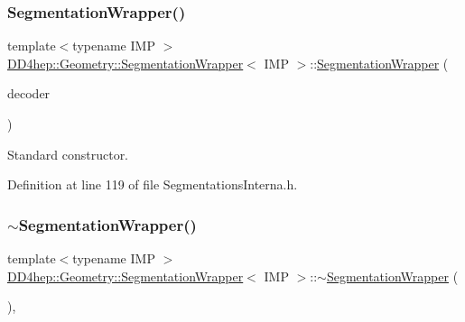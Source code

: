 \subsubsection{\texorpdfstring{Segmentation\+Wrapper()}{SegmentationWrapper()}}
{\footnotesize\ttfamily template$<$typename I\+MP $>$ \\
\hyperlink{class_d_d4hep_1_1_geometry_1_1_segmentation_wrapper}{D\+D4hep\+::\+Geometry\+::\+Segmentation\+Wrapper}$<$ I\+MP $>$\+::\hyperlink{class_d_d4hep_1_1_geometry_1_1_segmentation_wrapper}{Segmentation\+Wrapper} (\begin{DoxyParamCaption}\item[{\hyperlink{class_d_d4hep_1_1_d_d_segmentation_1_1_bit_field64}{D\+D\+Segmentation\+::\+Bit\+Field64} $\ast$}]{decoder }\end{DoxyParamCaption})\hspace{0.3cm}{\ttfamily [inline]}}



Standard constructor. 



Definition at line 119 of file Segmentations\+Interna.\+h.

\hypertarget{class_d_d4hep_1_1_geometry_1_1_segmentation_wrapper_a0fe7f6d55cdf27640ee18c8606b659b2}{}\label{class_d_d4hep_1_1_geometry_1_1_segmentation_wrapper_a0fe7f6d55cdf27640ee18c8606b659b2} 
\subsubsection{\texorpdfstring{$\sim$\+Segmentation\+Wrapper()}{~SegmentationWrapper()}}
{\footnotesize\ttfamily template$<$typename I\+MP $>$ \\
\hyperlink{class_d_d4hep_1_1_geometry_1_1_segmentation_wrapper}{D\+D4hep\+::\+Geometry\+::\+Segmentation\+Wrapper}$<$ I\+MP $>$\+::$\sim$\hyperlink{class_d_d4hep_1_1_geometry_1_1_segmentation_wrapper}{Segmentation\+Wrapper} (\begin{DoxyParamCaption}{ }\end{DoxyParamCaption})\hspace{0.3cm}{\ttfamily [inline]}, {\ttfamily [virtual]}}



